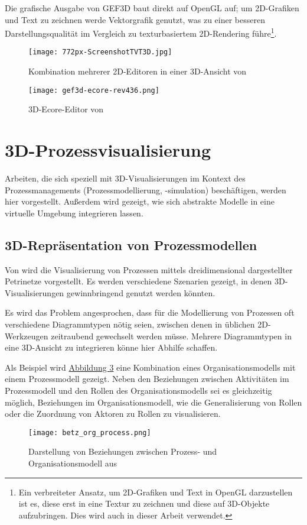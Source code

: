 \documentclass[a4paper,10pt]{sphinxmanual}
\begin{document}
Die grafische Ausgabe von GEF3D baut direkt auf OpenGL auf; um 2D-Grafiken und Text zu zeichnen werde Vektorgrafik genutzt, was zu einer besseren Darstellungsqualität im Vergleich zu texturbasiertem 2D-Rendering führe\footnote{
Ein verbreiteter Ansatz, um 2D-Grafiken und Text in OpenGL darzustellen ist es, diese erst in eine Textur zu zeichnen und diese auf 3D-Objekte aufzubringen. Dies wird auch in dieser Arbeit verwendet.
}.
\begin{figure}[htbp]
\centering
\capstart

\texttt{[image: 772px-ScreenshotTVT3D.jpg]}
\caption{Kombination mehrerer 2D-Editoren in einer 3D-Ansicht von \cite{www:gef3d}}\label{related:gef3d-twt3d}\end{figure}
\begin{figure}[htbp]
\centering
\capstart

\texttt{[image: gef3d-ecore-rev436.png]}
\caption{3D-Ecore-Editor von \cite{www:gef3ddevblog}}\label{related:gef3d-ecore}\end{figure}
\pagebreak

\section{3D-Prozessvisualisierung}
\label{related:d-prozessvisualisierung}
Arbeiten, die sich speziell mit 3D-Visualisierungen im Kontext des Prozessmanagements (Prozessmodellierung, -simulation) beschäftigen, werden hier vorgestellt.
Außerdem wird gezeigt, wie sich abstrakte Modelle in eine virtuelle Umgebung integrieren lassen.


\subsection{3D-Repräsentation von Prozessmodellen}
\label{related:betz}\label{related:d-reprasentation-von-prozessmodellen}
Von \cite{betz_3d_2008} wird die Visualisierung von Prozessen mittels dreidimensional dargestellter Petrinetze vorgestellt.
Es werden verschiedene Szenarien gezeigt, in denen 3D-Visualisierungen gewinnbringend genutzt werden könnten.

Es wird das Problem angesprochen, dass für die Modellierung von Prozessen oft verschiedene Diagrammtypen nötig seien, zwischen denen in üblichen 2D-Werkzeugen zeitraubend gewechselt werden müsse.
Mehrere Diagrammtypen in eine 3D-Ansicht zu integrieren könne hier Abhilfe schaffen.

Als Beispiel wird \hyperref[related:betz-org-process]{Abbildung  \ref*{related:betz-org-process}} eine Kombination eines Organisationsmodells mit einem Prozessmodell gezeigt.
Neben den Beziehungen zwischen Aktivitäten im Prozessmodell und den Rollen des Organisationsmodells sei es gleichzeitig möglich, Beziehungen im Organisationsmodell, wie die Generalisierung von Rollen oder die Zuordnung von Aktoren zu Rollen zu visualisieren.
\begin{figure}[htbp]
\centering
\capstart

\texttt{[image: betz\_org\_process.png]}
\caption{Darstellung von Beziehungen zwischen Prozess- und Organisationsmodell aus \cite{betz_3d_2008}}\label{related:betz-org-process}\end{figure}
\end{document}
